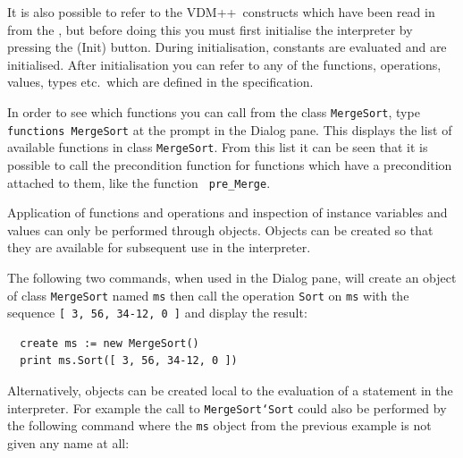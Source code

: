 \documentclass[\pformat,12pt]{article}
\newcommand{\vdmslpp}{VDM++}
\newcommand{\aaa}{\tt }
\newcommand{\cmd}{\tt }
\newcommand{\guicmd}[1]{{\sf #1}}
\begin{document}
It is also possible to refer to the \vdmslpp\ constructs which have
been read in from the 
, but before doing this you must first
initialise the 
interpreter by pressing the 
(\guicmd{Init}) button. 
During initialisation, constants are 
evaluated and  are initialised. 
After initialisation you can refer to any of the functions,
operations, 
values, types etc.\ which are defined in the
 specification.


In order to see which functions you can call from the class
{\aaa MergeSort}, type {\cmd functions MergeSort} at the
prompt in the
\guicmd{Dialog} pane.  This displays the list of available functions
in class {\aaa MergeSort}.  From this list it can be seen that it is
possible to call the precondition
function for functions which
have a precondition attached to them, like the function {\aaa
  pre\_Merge}.

Application of functions and operations and inspection of instance
variables and values can only be performed through objects.  Objects
can be created so that they are available for subsequent use in the
interpreter.

The following two commands, when used in the \guicmd{Dialog} pane, will
create an object of class {\aaa MergeSort} named {\aaa ms} then call
the operation {\tt Sort} on {\tt ms} with the sequence {\tt [ 3,
  56, 34-12, 0 ]} and display the result:

\begin{verbatim}
  create ms := new MergeSort()
  print ms.Sort([ 3, 56, 34-12, 0 ])
\end{verbatim}

Alternatively, objects can 
be created local to the evaluation of a statement in the interpreter.
 For example the call to {\tt MergeSort`Sort}
could also be performed by the following command where the {\tt ms}
object from the previous example is not given any name at all:
\end{document}
